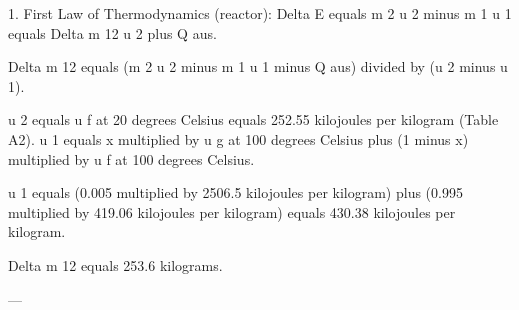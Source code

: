 1. First Law of Thermodynamics (reactor):  
Delta E equals m 2 u 2 minus m 1 u 1 equals Delta m 12 u 2 plus Q aus.  

Delta m 12 equals (m 2 u 2 minus m 1 u 1 minus Q aus) divided by (u 2 minus u 1).  

u 2 equals u f at 20 degrees Celsius equals 252.55 kilojoules per kilogram (Table A2).  
u 1 equals x multiplied by u g at 100 degrees Celsius plus (1 minus x) multiplied by u f at 100 degrees Celsius.  

u 1 equals (0.005 multiplied by 2506.5 kilojoules per kilogram) plus (0.995 multiplied by 419.06 kilojoules per kilogram) equals 430.38 kilojoules per kilogram.  

Delta m 12 equals 253.6 kilograms.  

---